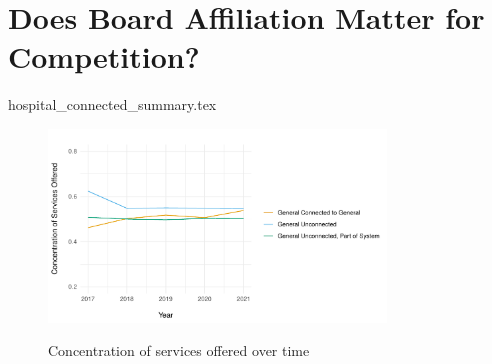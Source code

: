\documentclass[12pt]{article}
\begin{document}
    \section{Does Board Affiliation Matter for Competition?}

    {hospital_connected_summary.tex}

    \begin{figure}
        \centering
        \caption{Concentration of services offered over time}
        \includegraphics[width=0.8\textwidth]{Objects/concentration_services_time.pdf}
        \label{fig:concentration_services_time}
    \end{figure}


    

    

    

    

    

	
	
	
\end{document}
